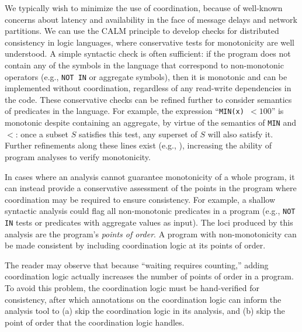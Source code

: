 We typically wish to minimize the use of coordination, because of well-known
concerns about latency and availability in the face of message delays and
network partitions.  We can use the CALM principle to develop checks for
distributed consistency in logic languages, where conservative tests for
monotonicity are well understood. A simple syntactic check is often sufficient:
if the program does not contain any of the symbols in the language that
correspond to non-monotonic operators (e.g., \texttt{NOT IN} or aggregate
symbols), then it is monotonic and can be implemented without coordination,
regardless of any read-write dependencies in the code.  These conservative
checks can be refined further to consider semantics of predicates in the
language. For example, the expression ``\texttt{MIN(x) $< 100$}'' is monotonic
despite containing an aggregate, by virtue of the semantics of \texttt{MIN} and
$<$: once a subset $S$ satisfies this test, any superset of $S$ will also
satisfy it.  Further refinements along these lines exist (e.g., \cite{ross-modular,ross-strat}), increasing the ability
of program analyses to verify monotonicity.
% 

In cases where an analysis cannot guarantee monotonicity of a whole program, it
can instead provide a conservative assessment of the points in the program where
coordination may be required to ensure consistency.  For example, a shallow
syntactic analysis could flag all non-monotonic predicates in a program (e.g.,
\texttt{NOT IN} tests or predicates with aggregate values as input). The loci
produced by this analysis are the program's \emph{points of order}. A program
with non-monotonicity can be made consistent by including coordination logic at
its points of order.

The reader may observe that because ``waiting requires counting,'' adding coordination logic actually increases the number of points of order in a program.  To avoid this problem, the coordination logic must be hand-verified for consistency, after which annotations on the coordination logic can inform the analysis tool to (a) skip the coordination logic in its analysis, and (b) skip the point of order that the coordination logic handles.  

